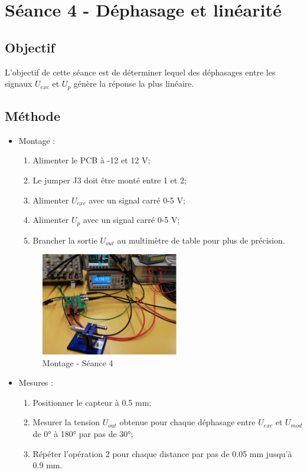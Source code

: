 \section{Séance 4 - Déphasage et linéarité}

\subsection{Objectif}

L'objectif de cette séance est de déterminer lequel des déphasages entre les signaux 
$U_{exc}$ et $U_{p}$ génère la réponse la plus linéaire.

\subsection{Méthode}

\begin{itemize}
    \item Montage : 
    \begin{enumerate}
    \item Alimenter le PCB à -12 et 12 V;
    \item Le jumper J3 doit être monté entre 1 et 2; 
    \item Alimenter $U_{exc}$ avec un signal carré 0-5 V;
    \item Alimenter $U_{p}$ avec un signal carré 0-5 V;
    \item Brancher la sortie $U_{out}$ au multimètre de table pour plus de précision.
\end{enumerate}


\begin{figure}[H]
    \centering
    \includegraphics[width=6cm]{Images/Seance4/MT4.jpg}
    \caption{Montage - Séance 4 \cite{donneelabo} }
    \label{fig:lum}
\end{figure}
\item Mesures :
\begin{enumerate}
    \item Positionner le capteur à 0.5 mm;
    \item Mesurer la tension $U_{out}$ obtenue pour chaque déphasage entre $U_{exc}$ et $U_{mod}$
    de 0° à 180° par pas de 30°;
    \item Répéter l'opération 2 pour chaque distance par pas de 0.05 mm jusqu'à 0.9 mm.
\end{enumerate}
\end{itemize}

